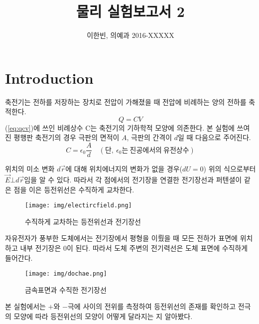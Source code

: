 \documentclass[a4paper]{article}
\title{물리 실험보고서 2}
\author{이한빈, 의예과 2016-XXXXX}
\begin{document}
\maketitle

\section{Introduction}


	축전기는 전하를 저장하는 장치로 전압이 가해졌을 때 전압에 비례하는 양의 전하를 축적한다.
		\begin{equation} \label{eq:qcv}
			Q=CV
		\end{equation}
	(\ref{eq:qcv})에 쓰인 비례상수 C는 축전기의 기하학적 모양에 의존한다. 본 실험에 쓰여진 평행판 축전기의 경우 극판의 면적이 $A$, 극판의 간격이 $d$일 때 다음으로 주어진다.
		\begin{equation} \label{eq:ppl}
			C=\epsilon_{0} \frac{A}{d} \quad (단, \: \epsilon_{0}는 \: 진공에서의 \: 유전상수)
		\end{equation}



	위치의 미소 변화 $d\vec{r}$에 대해 위치에너지의 변화가 없을 경우($dU=0$) 위의 식으로부터 $\vec{E}\bot{}d\vec{r}$임을 알 수 있다. 따라서 각 점에서의 전기장을 연결한 전기장선과 퍼텐셜이 같은 점을 이은 등전위선은 수직하게 교차한다.

		\begin{figure}[htbp]
			\begin{center}
			    \texttt{[image: img/electircfield.png]}
    			\caption{수직하게 교차하는 등전위선과 전기장선} \label{fig:ex1}
			\end{center}
		\end{figure}

	자유전자가 풍부한 도체에서는 전기장에서 평형을 이뤘을 때 모든 전하가 표면에 위치하고 내부 전기장은 0이 된다. 따라서 도체 주변의 전기력선은 도체 표면에 수직하게 들어간다.
\newpage

		\begin{figure}[htbp]
			\begin{center}
    			\texttt{[image: img/dochae.png]}
    			\caption{금속표면과 수직한 전기장선} \label{fig:ex2}
			\end{center}
		\end{figure}

	본 실험에서는 $+$와 $-$극에 사이의 전위를 측정하여 등전위선의 존재를 확인하고 전극의 모양에 따라 등전위선의 모양이 어떻게 달라지는 지 알아봤다.
\end{document}
